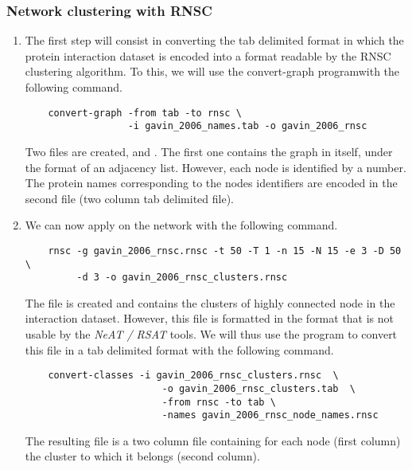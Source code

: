 \subsubsection{Network clustering with RNSC}
\begin{enumerate}
\item The first step will consist in converting the tab delimited format in which the protein interaction dataset
is encoded into a format readable by the RNSC clustering algorithm. To this, we will use the convert-graph programwith
the following command.

	{\color{Blue} \begin{footnotesize} 
		\begin{verbatim}
	convert-graph -from tab -to rnsc \
	              -i gavin_2006_names.tab -o gavin_2006_rnsc
		\end{verbatim} \end{footnotesize}
	}

Two files are created,  and . The first one contains the graph in itself, under the format of an adjacency list. However, each node is identified by a number. The protein names corresponding to the nodes identifiers are encoded in the second file (two column tab delimited file).

\item We can now apply  on the network with the following command.

	{\color{Blue} \begin{footnotesize} 
		\begin{verbatim}
	rnsc -g gavin_2006_rnsc.rnsc -t 50 -T 1 -n 15 -N 15 -e 3 -D 50  \
	     -d 3 -o gavin_2006_rnsc_clusters.rnsc
		\end{verbatim} \end{footnotesize}
	}
		
		
The file  is created and contains the clusters of highly connected node in the interaction dataset. However, this file is formatted in the  format that is not usable by the \textit{NeAT / RSAT} tools. We will thus use the program  to convert this file in a tab delimited format with the following command.

	{\color{Blue} \begin{footnotesize} 
		\begin{verbatim}
	convert-classes -i gavin_2006_rnsc_clusters.rnsc  \
                        -o gavin_2006_rnsc_clusters.tab  \
                        -from rnsc -to tab \
                        -names gavin_2006_rnsc_node_names.rnsc
		\end{verbatim} \end{footnotesize}
	}
The resulting file is a two column file containing for each node (first column) the cluster to which it belongs (second column).

\end{enumerate}

